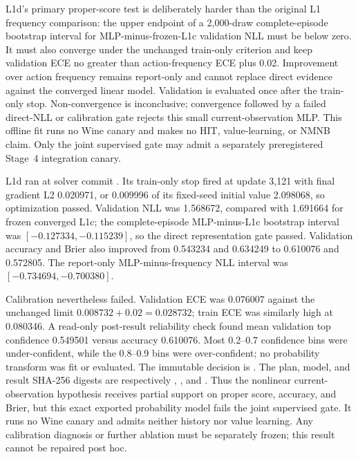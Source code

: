 \documentclass[11pt]{article}
\begin{document}
L1d's primary proper-score test is deliberately harder than the original L1
frequency comparison: the upper endpoint of a 2,000-draw complete-episode
bootstrap interval for MLP-minus-frozen-L1c validation NLL must be below zero.
It must also converge under the unchanged train-only criterion and keep
validation ECE no greater than action-frequency ECE plus 0.02.  Improvement
over action frequency remains report-only and cannot replace direct evidence
against the converged linear model.  Validation is evaluated once after the
train-only stop.  Non-convergence is inconclusive; convergence followed by a
failed direct-NLL or calibration gate rejects this small current-observation
MLP.  This offline fit runs no Wine canary and makes no HIT, value-learning, or
NMNB claim.  Only the joint supervised gate may admit a separately
preregistered Stage~4 integration canary.

L1d ran at solver commit
.  Its train-only stop fired
at update 3,121 with final gradient L2 0.020971, or 0.009996 of its fixed-seed
initial value 2.098068, so optimization passed.  Validation NLL was 1.568672,
compared with 1.691664 for frozen converged L1c; the complete-episode
MLP-minus-L1c bootstrap interval was $[-0.127334,-0.115239]$, so the direct
representation gate passed.  Validation accuracy and Brier also improved from
0.543234 and 0.634249 to 0.610076 and 0.572805.  The report-only
MLP-minus-frequency NLL interval was $[-0.734694,-0.700380]$.

Calibration nevertheless failed.  Validation ECE was 0.076007 against the
unchanged limit $0.008732+0.02=0.028732$; train ECE was similarly high at
0.080346.  A read-only post-result reliability check found mean validation top
confidence 0.549501 versus accuracy 0.610076.  Most 0.2--0.7 confidence bins
were under-confident, while the 0.8--0.9 bins were over-confident; no
probability transform was fit or evaluated.  The immutable decision is
.  The plan, model, and result
SHA-256 digests are respectively
,
,
and
.
Thus the nonlinear current-observation hypothesis receives partial support on
proper score, accuracy, and Brier, but this exact exported probability model
fails the joint supervised gate.  It runs no Wine canary and admits neither
history nor value learning.  Any calibration diagnosis or further ablation
must be separately frozen; this result cannot be repaired post hoc.
\end{document}
